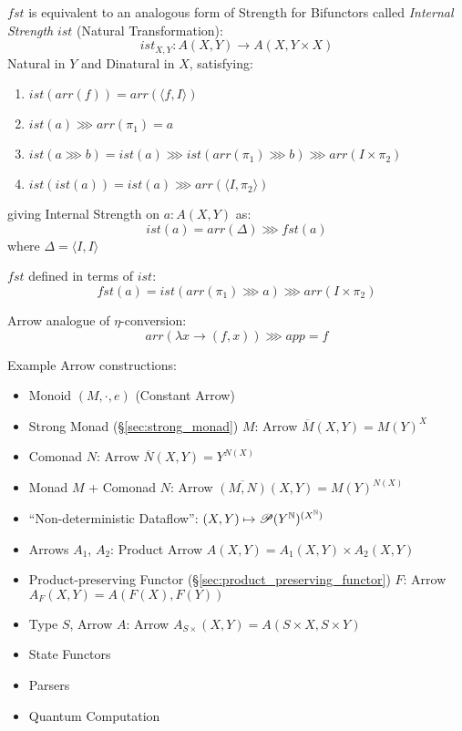 $fst$ is equivalent to an analogous form of Strength for Bifunctors
called \emph{Internal Strength} $ist$ (Natural Transformation):
\[
  ist_{X,Y} : A(X,Y) \rightarrow A(X,Y \times X)
\]
Natural in $Y$ and Dinatural in $X$, satisfying:
\begin{enumerate}
  \item $ist(arr(f)) = arr(\langle f,I \rangle)$
  \item $ist(a) \ggg arr(\pi_1) = a$
  \item $ist(a \ggg b) = ist(a) \ggg ist(arr(\pi_1) \ggg b) \ggg arr(I
    \times \pi_2)$
  \item $ist(ist(a)) = ist(a) \ggg arr(\langle I, \pi_2 \rangle)$
\end{enumerate}
giving Internal Strength on $a : A(X,Y)$ as:
\[
  ist(a) = arr(\Delta) \ggg fst(a)
\]
where $\Delta = \langle I,I \rangle$

$fst$ defined in terms of $ist$:
\[
  fst(a) = ist(arr(\pi_1) \ggg a) \ggg arr(I \times \pi_2)
\]

Arrow analogue of $\eta$-conversion:\cite{hughes98}
\[
  arr (\lambda x \rightarrow (f,x)) \ggg app = f
\]

Example Arrow constructions:
\begin{itemize}
  \item Monoid $(M,\cdot,e)$ (Constant Arrow)
  \item Strong Monad (\S\ref{sec:strong_monad}) $M$: Arrow
    $\overline{M}(X,Y) = M(Y)^X$
  \item Comonad $N$: Arrow $\overline{N}(X,Y) = Y^{N(X)}$
  \item Monad $M$ + Comonad $N$: Arrow
    $\overline{(M,N)}(X,Y) = M(Y)^{N(X)}$
  \item ``Non-deterministic Dataflow'':
    $(X,Y) \mapsto \mathscr{P}(Y^{\mathbb{N}})^{(X^{\mathbb{N}})}$
  \item Arrows $A_1$, $A_2$: Product Arrow
    $A(X,Y) = A_1(X,Y) \times A_2(X,Y)$
  \item Product-preserving Functor
    (\S\ref{sec:product_preserving_functor}) $F$: Arrow
    $A_F(X,Y) = A(F(X),F(Y))$
  \item Type $S$, Arrow $A$: Arrow
    $A_{S\times}(X,Y) = A(S \times X, S \times Y)$
  \item State Functors
  \item Parsers
  \item Quantum Computation
\end{itemize}
\cite{jacobs-heunen-hasuo09}



